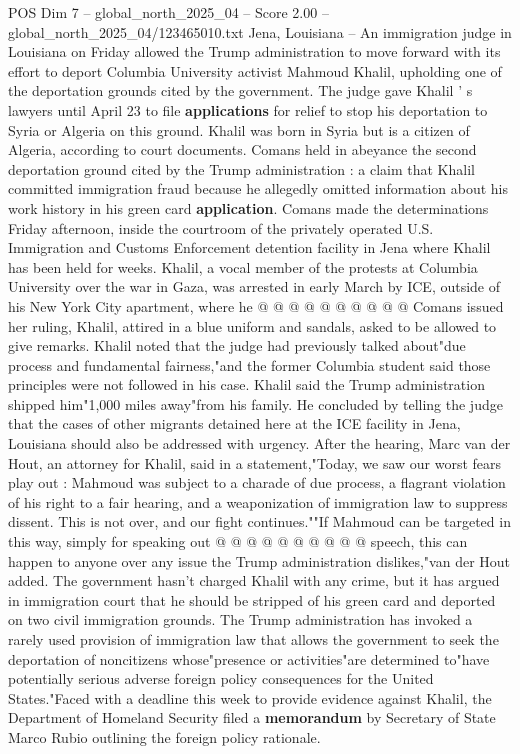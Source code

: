 \begin{textsample}{POS Dim 7 – global\_north\_2025\_04 – Score 2.00 – global\_north\_2025\_04/123465010.txt}  \label{ex:f7_pos_351}
Jena, Louisiana -- An immigration judge in Louisiana on Friday allowed the Trump administration to move forward with its effort to deport Columbia University activist Mahmoud Khalil, upholding one of the deportation grounds cited by the government.
The judge gave Khalil ' s lawyers until April 23 to file \textbf{applications} for relief to stop his deportation to Syria or Algeria on this ground.
Khalil was born in Syria but is a citizen of Algeria, according to court documents.
Comans held in abeyance the second deportation ground cited by the Trump administration : a claim that Khalil committed immigration fraud because he allegedly omitted information about his work history in his green card \textbf{application}.
Comans made the determinations Friday afternoon, inside the courtroom of the privately operated U.S.
Immigration and Customs Enforcement detention facility in Jena where Khalil has been held for weeks.
Khalil, a vocal member of the protests at Columbia University over the war in Gaza, was arrested in early March by ICE, outside of his New York City apartment, where he @ @ @ @ @ @ @ @ @ @ Comans issued her ruling, Khalil, attired in a blue uniform and sandals, asked to be allowed to give remarks.
Khalil noted that the judge had previously talked about"due process and fundamental fairness,"and the former Columbia student said those principles were not followed in his case.
Khalil said the Trump administration shipped him"1,000 miles away"from his family.
He concluded by telling the judge that the cases of other migrants detained here at the ICE facility in Jena, Louisiana should also be addressed with urgency.
After the hearing, Marc van der Hout, an attorney for Khalil, said in a statement,"Today, we saw our worst fears play out : Mahmoud was subject to a charade of due process, a flagrant violation of his right to a fair hearing, and a weaponization of immigration law to suppress dissent.
This is not over, and our fight continues.""If Mahmoud can be targeted in this way, simply for speaking out @ @ @ @ @ @ @ @ @ @ speech, this can happen to anyone over any issue the Trump administration dislikes,"van der Hout added.
The government hasn't charged Khalil with any crime, but it has argued in immigration court that he should be stripped of his green card and deported on two civil immigration grounds.
The Trump administration has invoked a rarely used provision of immigration law that allows the government to seek the deportation of noncitizens whose"presence or activities"are determined to"have potentially serious adverse foreign policy consequences for the United States."Faced with a deadline this week to provide evidence against Khalil, the Department of Homeland Security filed a \textbf{memorandum} by Secretary of State Marco Rubio outlining the foreign policy rationale.

\end{textsample}
